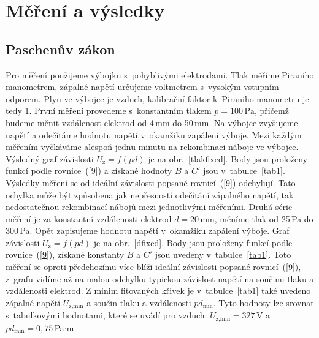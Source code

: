 \documentclass[a4paper,12pt]{article}
\begin{document}
\section{Měření a výsledky}
\subsection{Paschenův zákon}
Pro měření použijeme výbojku s~pohyblivými elektrodami. Tlak měříme Piraniho 
manometrem, zápalné napětí určujeme voltmetrem s~vysokým vstupním odporem. Plyn 
ve výbojce je vzduch, kalibrační faktor k~Piraniho manometru je tedy 1. První 
měření provedeme s~konstantním tlakem $p = 100\,\si{\pascal}$, přičemž budeme 
měnit vzdálenost elektrod od 4\,\si{\milli\meter} do 50\,\si{\milli\meter}. Na 
výbojce zvyšujeme napětí a odečítáme hodnotu napětí v~okamžiku zapálení výboje. 
Mezi každým měřením vyčkáváme alespoň jednu minutu na rekombinaci náboje ve 
výbojce. Výsledný graf závislosti $U_\text{z} = f(pd)$ je na 
obr.~\ref{tlakfixed}. 
Body jsou proloženy funkcí podle rovnice~(\ref{9}) a získané hodnoty $B$ 
a $C'$ jsou v~tabulce~\ref{tab1}. Výsledky měření se od ideální závislosti 
popsané 
rovnicí~(\ref{9}) odchylují. Tato ochylka může být způsobena jak 
nepřesností odečítání zápalného napětí, tak nedostatečnou rekombinací nábojů 
mezi jednotlivými měřeními. 
Druhá série měření je za konstantní vzdálenosti elektrod $d = 
20\,\si{\milli\meter}$, 
měníme tlak od 25\,\si{\pascal} do 300\,\si{\pascal}. Opět zapisujeme hodnotu 
napětí v~okamžiku zapálení výboje. Graf závislosti $U_\text{z} = f(pd)$ je na 
obr.~\ref{dfixed}. Body jsou proloženy funkcí podle rovnice~(\ref{9}), získané 
konstanty 
$B$ a $C'$ jsou uvedeny v~tabulce~\ref{tab1}. Toto měření se oproti 
předchozímu více 
blíží ideální závislosti popsané rovnicí~(\ref{9}), z~grafu vidíme až na malou 
odchylku typickou závislost napětí na součinu tlaku a vzdálenosti elektrod.
Z minim fitovaných křivek je v~tabulce~\ref{tab1} také uvedeno zápalné napětí 
$U_\text{z,min}$ a 
součin tlaku a vzdálenosti $pd_{\text{min}}$. Tyto hodnoty 
lze srovnat s~tabulkovými hodnotami, které se uvádí pro vzduch: 
$U_\text{z,min} = 327$\,V a $pd_{\text{min}} = 0,75$\,Pa$\cdot$m.
\end{document}
